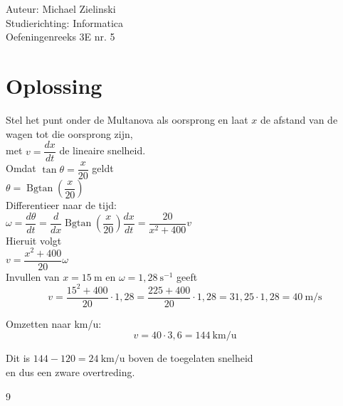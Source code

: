 \documentclass[a4paper]{article}
\begin{document}
\noindent \large Auteur: Michael Zielinski \\

\noindent \large Studierichting: Informatica\\

\noindent \large Oefeningenreeks 3E nr. 5 \\

\normalsize

\section*{Oplossing}

Stel het punt onder de Multanova als oorsprong en laat $x$ de afstand van de wagen tot die oorsprong zijn,\\
met $v=\dfrac{dx}{dt}$ de lineaire snelheid. \\

Omdat $\tan\theta = \dfrac{x}{20}$ geldt\\

$\theta = \operatorname{Bgtan}\left(\dfrac{x}{20}\right)$ \\

Differentieer naar de tijd:\\

$\omega = \dfrac{d\theta}{dt}
= \dfrac{d}{dx}\operatorname{Bgtan}\left(\dfrac{x}{20}\right)\dfrac{dx}{dt}
= \dfrac{20}{x^{2}+400}v$ \\

Hieruit volgt\\

$v = \dfrac{x^{2}+400}{20}\omega$ \\

Invullen van $x=15\ \mathrm{m}$ en $\omega=1,28\ \mathrm{s^{-1}}$ geeft\\

$$
v = \dfrac{15^{2}+400}{20}\cdot 1,28
= \dfrac{225+400}{20}\cdot 1,28
= 31,25\cdot 1,28
= 40\ \mathrm{m/s}
$$

Omzetten naar km/u:\\

$$
v = 40\cdot 3,6 = 144\ \mathrm{km/u}
$$

Dit is $144 - 120 = 24\ \mathrm{km/u}$ boven de toegelaten snelheid\\

en dus een zware overtreding. \\

\begin{thebibliography}{9}
\end{thebibliography}
\end{document}
